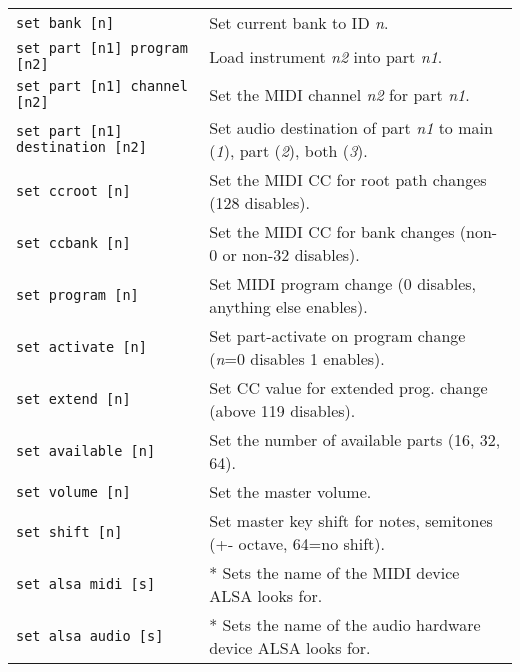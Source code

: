 \begin{table}[H]
\begin{tabular}{l l}
         \texttt{set bank [n]} &
            Set current bank to ID \textsl{n}. \\

         \texttt{set part [n1] program [n2]} &
            Load instrument \textsl{n2} into part \textsl{n1}. \\

         \texttt{set part [n1] channel [n2]} &
            Set the MIDI channel \textsl{n2} for part \textsl{n1}. \\

         \texttt{set part [n1] destination [n2]} &
            Set audio destination of part \textsl{n1}
            to main (\textsl{1}), part (\textsl{2}), both (\textsl{3}). \\

         \texttt{set ccroot [n]} &
            Set the MIDI CC for root path changes (128 disables). \\

         \texttt{set ccbank [n]} &
            Set the MIDI CC for bank changes (non-0 or non-32 disables). \\

         \texttt{set program [n]} &
            Set MIDI program change (0 disables, anything else enables). \\

         \texttt{set activate [n]} &
            Set part-activate on program change (\textsl{n}=0 disables
            1 enables). \\

         \texttt{set extend [n]} &
            Set CC value for extended prog. change (above 119 disables). \\

         \texttt{set available [n]} &
            Set the number of available parts (16, 32, 64). \\

         \texttt{set volume [n]} &
            Set the master volume. \\

         \texttt{set shift [n]} &
            Set master key shift for notes, semitones (+- octave,
            64=no shift). \\

         \texttt{set alsa midi [s]} &
            * Sets the name of the MIDI device ALSA looks for. \\

         \texttt{set alsa audio [s]} &
            * Sets the name of the audio hardware device ALSA looks for. \\


\end{tabular}
\end{table}
